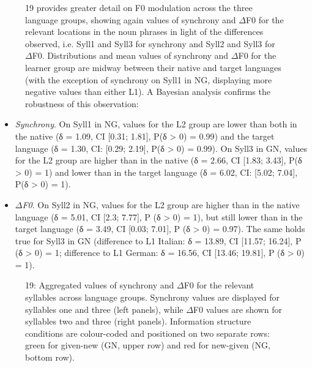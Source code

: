 \begin{figure}
\caption{19 provides greater detail on F0 modulation across the three language groups, showing again values of synchrony and ${\Delta}$F0 for the relevant locations in the noun phrases in light of the differences observed, i.e. Syll1 and Syll3 for synchrony and Syll2 and Syll3 for ${\Delta}$F0. Distributions and mean values of synchrony and ${\Delta}$F0 for the learner group are midway between their native and target languages (with the exception of synchrony on Syll1 in NG, displaying more negative values than either L1). A Bayesian analysis confirms the robustness of this observation:}
\label{fig:key:2}
\end{figure}

\begin{itemize}
\item \textit{Synchrony}. On Syll1 in NG, values for the L2 group are lower than both in the native (δ = 1.09, CI [0.31; 1.81], P(δ > 0) = 0.99) and the target language (δ = 1.30, CI: [0.29; 2.19], P(δ > 0) = 0.99). On Syll3 in GN, values for the L2 group are higher than in the native (δ = 2.66, CI [1.83; 3.43], P(δ > 0) = 1) and lower than in the target language (δ = 6.02, CI: [5.02; 7.04], P(δ > 0) = 1).
\item \textit{${\Delta}$F0}. On Syll2 in NG, values for the L2 group are higher than in the native language (δ = 5.01, CI [2.3; 7.77], P (δ > 0) = 1), but still lower than in the target language (δ = 3.49, CI [0.03; 7.01], P (δ > 0) = 0.97). The same holds true for Syll3 in GN (difference to L1 Italian: δ = 13.89, CI [11.57; 16.24], P (δ > 0) = 1; difference to L1 German: δ = 16.56, CI [13.46; 19.81], P (δ > 0) = 1).
\end{itemize}

  
 

\begin{stylecaption}\begin{figure}
\caption{19: Aggregated values of synchrony and ${\Delta}$F0 for the relevant syllables across language groups. Synchrony values are displayed for syllables one and three (left panels), while ${\Delta}$F0 values are shown for syllables two and three (right panels). Information structure conditions are colour-coded and positioned on two separate rows: green for given-new (GN, upper row) and red for new-given (NG, bottom row).}
\label{fig:key:2}
\end{figure}\end{stylecaption}

